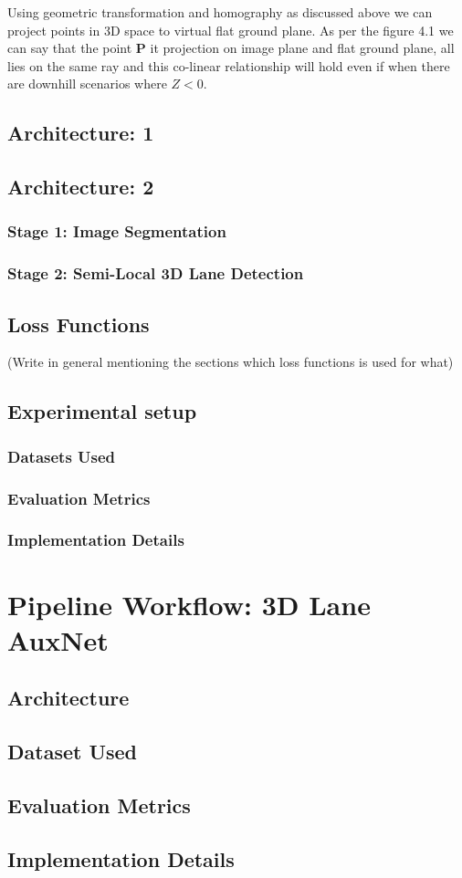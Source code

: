     Using geometric transformation and homography as discussed above we can project points in 3D space to virtual flat ground plane. As per the figure 4.1 we can say that the point \textbf{P} it projection on image plane and flat ground plane, all lies on the same ray and this co-linear relationship will hold even if when there are downhill scenarios where $Z<0$.  
    
    
    
        
        \subsection{Architecture: 1}
        
        \subsection{Architecture: 2}
        \subsubsection{Stage 1: Image Segmentation}
        \subsubsection{Stage 2: Semi-Local 3D Lane Detection}
    
    \subsection{Loss Functions}
        (Write in general mentioning the sections which loss functions is used for what)
        
    \subsection{Experimental setup}
        \subsubsection{Datasets Used}
        \subsubsection{Evaluation Metrics}
        \subsubsection{Implementation Details}
    
    \section{Pipeline Workflow: 3D Lane AuxNet}
        \subsection{Architecture}
        \subsection{Dataset Used}
        \subsection{Evaluation Metrics}
        \subsection{Implementation Details}
        

